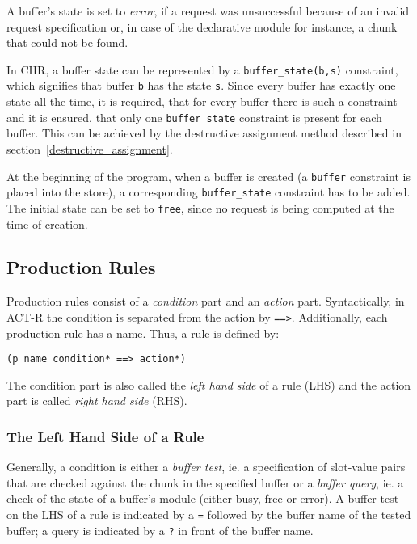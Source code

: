 A buffer's state is set to \emph{error}, if a request was unsuccessful because of an invalid request specification or, in case of the declarative module for instance, a chunk that could not be found.

In CHR, a buffer state can be represented by a \verb|buffer_state(b,s)| constraint, which signifies that buffer \verb|b| has the state \verb|s|. Since every buffer has exactly one state all the time, it is required, that for every buffer there is such a constraint and it is ensured, that only one \verb|buffer_state| constraint is present for each buffer. This can be achieved by the destructive assignment method described in section~\ref{destructive_assignment}. 

At the beginning of the program, when a buffer is created (a \verb|buffer| constraint is placed into the store), a corresponding \verb|buffer_state| constraint has to be added. The initial state can be set to \verb|free|, since no request is being computed at the time of creation.

\subsection{Production Rules}

Production rules consist of a \emph{condition} part and an \emph{action} part. Syntactically, in ACT-R the condition is separated from the action by \verb|==>|. Additionally, each production rule has a name. Thus, a rule is defined by:

\begin{verbatim}
(p name condition* ==> action*)
\end{verbatim}

The condition part is also called the \emph{left hand side} of a rule (LHS) and the action part is called \emph{right hand side} (RHS).

\subsubsection{The Left Hand Side of a Rule}

Generally, a condition is either a \emph{buffer test}, ie. a specification of slot-value pairs that are checked against the chunk in the specified buffer or a \emph{buffer query}, ie. a check of the state of a buffer's module (either busy, free or error). A buffer test on the LHS of a rule is indicated by a \verb|=| followed by the buffer name of the tested buffer; a query is indicated by a \verb|?| in front of the buffer name.

